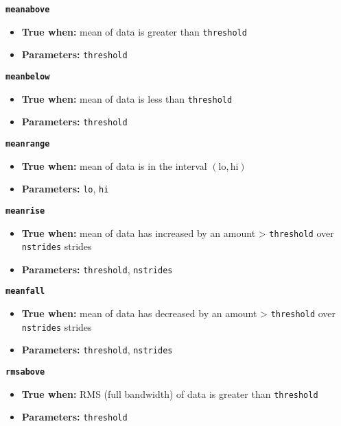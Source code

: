 \documentclass[11pt]{article}
\begin{document}
{\large\texttt{\textbf{meanabove}}}

\begin{itemize}
\item \textbf{True when:} mean of data is greater than
  \texttt{threshold}
\item \textbf{Parameters:} \texttt{threshold}
\end{itemize}


{\large\texttt{\textbf{meanbelow}}}

\begin{itemize}
\item \textbf{True when:} mean of data is less than
  \texttt{threshold}
\item \textbf{Parameters:} \texttt{threshold}
\end{itemize}


{\large\texttt{\textbf{meanrange}}}

\begin{itemize}
\item \textbf{True when:} mean of data is in the interval 
  $(\mathrm{lo}, \mathrm{hi})$ 
\item \textbf{Parameters:} \texttt{lo}, \texttt{hi}
\end{itemize}

{\large\texttt{\textbf{meanrise}}}

\begin{itemize}
\item \textbf{True when:} mean of data has increased by an amount >
  \texttt{threshold} over \texttt{nstrides} strides
\item \textbf{Parameters:} \texttt{threshold}, \texttt{nstrides}
\end{itemize}

{\large\texttt{\textbf{meanfall}}}

\begin{itemize}
\item \textbf{True when:} mean of data has decreased by an amount >
  \texttt{threshold} over \texttt{nstrides} strides
\item \textbf{Parameters:} \texttt{threshold}, \texttt{nstrides}
\end{itemize}

{\large\texttt{\textbf{rmsabove}}}

\begin{itemize}
\item \textbf{True when:} RMS (full bandwidth) of data is greater than
  \texttt{threshold}
\item \textbf{Parameters:} \texttt{threshold}
\end{itemize}
\end{document}
